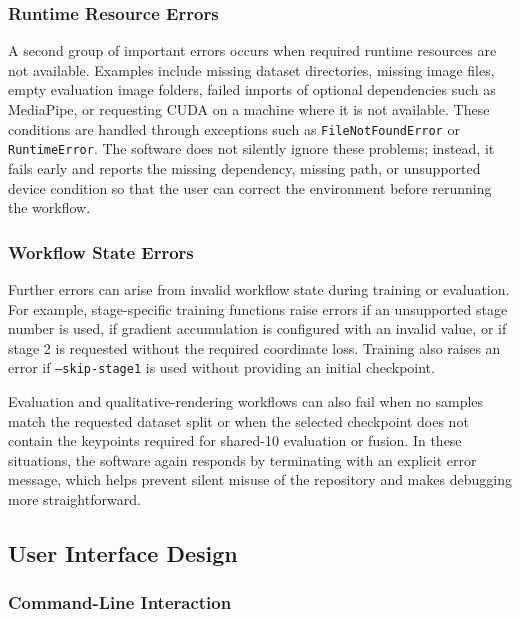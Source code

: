 ﻿\documentclass[11pt,a4paper]{article}
\begin{document}
\subsubsection*{Runtime Resource Errors}

A second group of important errors occurs when required runtime resources are
not available. Examples include missing dataset directories, missing image
files, empty evaluation image folders, failed imports of optional dependencies
such as MediaPipe, or requesting CUDA on a machine where it is not available.
These conditions are handled through exceptions such as
\texttt{FileNotFoundError} or \texttt{RuntimeError}.
The software does not silently ignore these problems; instead, it fails early
and reports the missing dependency, missing path, or unsupported device
condition so that the user can correct the environment before rerunning the
workflow.

\subsubsection*{Workflow State Errors}

Further errors can arise from invalid workflow state during training or
evaluation. For example, stage-specific training functions raise errors if an
unsupported stage number is used, if gradient accumulation is configured with
an invalid value, or if stage 2 is requested without the required coordinate
loss. Training also raises an error if \texttt{--skip-stage1} is used without
providing an initial checkpoint.

\medskip

Evaluation and qualitative-rendering workflows can also fail when no samples
match the requested dataset split or when the selected checkpoint does not
contain the keypoints required for shared-10 evaluation or fusion. In these
situations, the software again responds by terminating with an explicit error
message, which helps prevent silent misuse of the repository and makes
debugging more straightforward.

\subsection{User Interface Design}

\subsubsection*{Command-Line Interaction}
\end{document}
